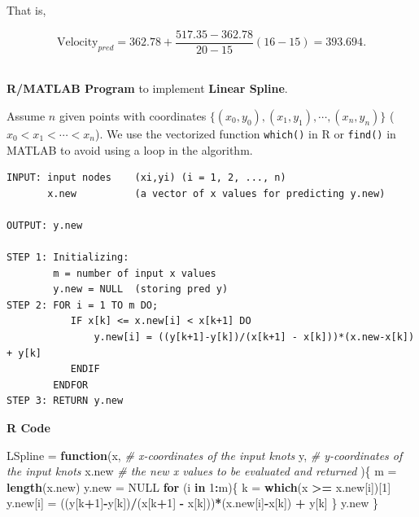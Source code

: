 \documentclass[
]{book}
\newenvironment{Shaded}{\begin{snugshade}}{\end{snugshade}}
\newcommand{\CommentTok}[1]{\textcolor[rgb]{0.56,0.35,0.01}{\textit{#1}}}
\newcommand{\ConstantTok}[1]{\textcolor[rgb]{0.56,0.35,0.01}{#1}}
\newcommand{\ControlFlowTok}[1]{\textcolor[rgb]{0.13,0.29,0.53}{\textbf{#1}}}
\newcommand{\DecValTok}[1]{\textcolor[rgb]{0.00,0.00,0.81}{#1}}
\newcommand{\FunctionTok}[1]{\textcolor[rgb]{0.13,0.29,0.53}{\textbf{#1}}}
\newcommand{\NormalTok}[1]{#1}
\newcommand{\OtherTok}[1]{\textcolor[rgb]{0.56,0.35,0.01}{#1}}
\newcommand{\SpecialCharTok}[1]{\textcolor[rgb]{0.81,0.36,0.00}{\textbf{#1}}}
\begin{document}
That is,

\[
\text{Velocity}_{pred} = 362.78 + \frac{517.35 - 362.78}{20-15}(16-15) = 393.694.
\]\\

\hfill\break

\textbf{R/MATLAB Program} to implement \textbf{Linear Spline}.

Assume \(n\) given points with coordinates \(\{(x_0, y_0), (x_1, y_1), \cdots, (x_n, y_n) \}\) (\(x_0 < x_1 < \cdots < x_n\)). We use the vectorized function \texttt{which()} in R or \texttt{find()} in MATLAB to avoid using a loop in the algorithm.

\begin{verbatim}
INPUT: input nodes    (xi,yi) (i = 1, 2, ..., n)
       x.new          (a vector of x values for predicting y.new)

OUTPUT: y.new

STEP 1: Initializing:
        m = number of input x values
        y.new = NULL  (storing pred y)
STEP 2: FOR i = 1 TO m DO;
           IF x[k] <= x.new[i] < x[k+1] DO
               y.new[i] = ((y[k+1]-y[k])/(x[k+1] - x[k]))*(x.new-x[k]) + y[k]
           ENDIF
        ENDFOR
STEP 3: RETURN y.new
\end{verbatim}

\hfill\break

\textbf{R Code}

\begin{Shaded}
\begin{Highlighting}[]
\NormalTok{LSpline }\OtherTok{=} \ControlFlowTok{function}\NormalTok{(x,        }\CommentTok{\# x{-}coordinates of the input knots}
\NormalTok{                   y,        }\CommentTok{\# y{-}coordinates of the input knots}
\NormalTok{                   x.new     }\CommentTok{\# the new x values to be evaluated and returned}
\NormalTok{                   )\{}
\NormalTok{    m }\OtherTok{=} \FunctionTok{length}\NormalTok{(x.new)}
\NormalTok{    y.new }\OtherTok{=} \ConstantTok{NULL}
    \ControlFlowTok{for}\NormalTok{ (i }\ControlFlowTok{in} \DecValTok{1}\SpecialCharTok{:}\NormalTok{m)\{}
\NormalTok{       k }\OtherTok{=} \FunctionTok{which}\NormalTok{(x }\SpecialCharTok{\textgreater{}=}\NormalTok{ x.new[i])[}\DecValTok{1}\NormalTok{]}
\NormalTok{       y.new[i] }\OtherTok{=}\NormalTok{ ((y[k}\SpecialCharTok{+}\DecValTok{1}\NormalTok{]}\SpecialCharTok{{-}}\NormalTok{y[k])}\SpecialCharTok{/}\NormalTok{(x[k}\SpecialCharTok{+}\DecValTok{1}\NormalTok{] }\SpecialCharTok{{-}}\NormalTok{ x[k]))}\SpecialCharTok{*}\NormalTok{(x.new[i]}\SpecialCharTok{{-}}\NormalTok{x[k]) }\SpecialCharTok{+}\NormalTok{ y[k]}
\NormalTok{    \}  }
\NormalTok{    y.new}
\NormalTok{\}}
\end{Highlighting}
\end{Shaded}
\end{document}
